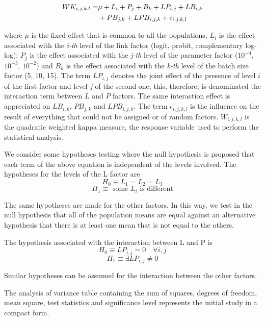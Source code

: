\documentclass[journal]{IEEEtran}
\begin{document}
	\begin{equation}
	\begin{aligned}
	\footnotesize
	WK_{i,j,k,l} = & \mu + L_i + P_j + B_k + LP_{i,j} + LB_{i,k} \\& + PB_{j,k} + LPB_{i,j,k} + \epsilon_{i,j,k,l}
	\label{eq:anova3}
	\end{aligned}
	\end{equation}
	
	where $\mu$ is the fixed effect that is common to all the populations; $L_i$ is the effect associated with the \textit{i-th} level of the link factor (logit, probit, complementary log-log); $P_j$ is the effect associated with the \textit{j-th} level of the parameter factor ($10^{-4}$, $10^{-3}$, $10^{-2}$) and $B_k$ is the effect associated with the \textit{k-th} level of the batch size factor (5, 10, 15). The term $LP_{i,j}$ denotes the joint effect of the presence of level $i$ of the first factor and level $j$ of the second one; this, therefore, is denominated the interaction term between $L$ and $P$ factors. The same interaction effect is appreciated on $LB_{i,k}$, $PB_{j,k}$ and $LPB_{i,j,k}$. The term $\epsilon_{i,j,k,l}$ is the influence on the result of everything that could not be assigned or of random factors. $W_{i,j,k,l}$ is the quadratic weighted kappa measure, the response variable used to perform the statistical analysis.
	
	We consider some hypotheses testing where the null hypothesis is proposed that each term of the above equation is independent of the levels involved. The hypotheses for the levels of the L factor are
	\[
	H_0 \equiv L_1 = L_2 = L_3
	\]
	\[
	H_1 \equiv \text{ some } L_i \text{ is different}
	\]
	
	The same hypotheses are made for the other factors. In this way, we test in the null hypothesis that all of the population means are equal against an alternative hypothesis that there is at least one mean that is not equal to the others.
	
	The hypothesis associated with the interaction between L and P is
	\[
	H_0 \equiv LP_{i,j} = 0 \quad \forall i,j
	\]
	\[
	H_1 \equiv \exists LP_{i,j} \ne 0
	\]
	
	Similar hypotheses can be assumed for the interaction between the other factors.
	
	The analysis of variance table containing the sum of squares, degrees of freedom, mean square, test statistics and significance level represents the initial study in a compact form.
	
\end{document}
